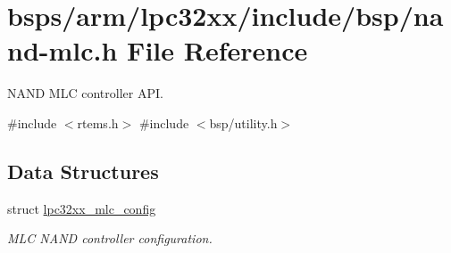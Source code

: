 \hypertarget{nand-mlc_8h}{}\section{bsps/arm/lpc32xx/include/bsp/nand-\/mlc.h File Reference}
\label{nand-mlc_8h}


N\+A\+ND M\+LC controller A\+PI.  


{\ttfamily \#include $<$rtems.\+h$>$}\newline
{\ttfamily \#include $<$bsp/utility.\+h$>$}\newline
\subsection*{Data Structures}
\begin{DoxyCompactItemize}
\item 
struct \mbox{\hyperlink{structlpc32xx__mlc__config}{lpc32xx\+\_\+mlc\+\_\+config}}
\begin{DoxyCompactList}\small\item\em M\+LC N\+A\+ND controller configuration. \end{DoxyCompactList}\end{DoxyCompactItemize}
